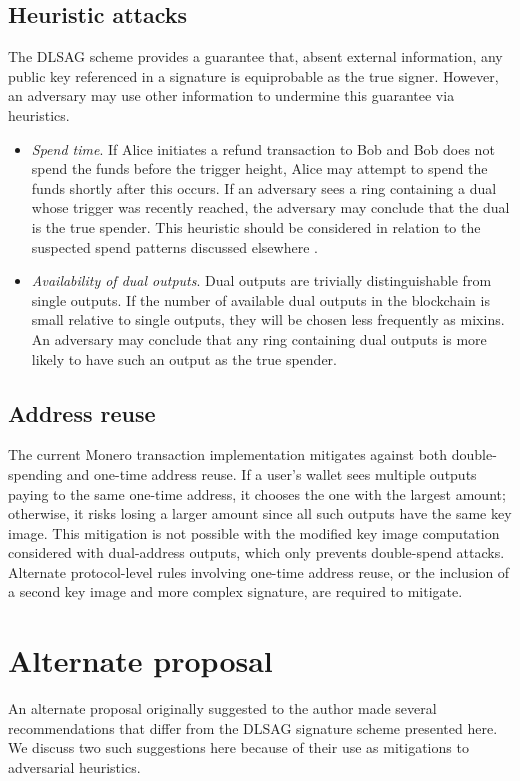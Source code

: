 \documentclass{mrl}
\begin{document}
\subsection{Heuristic attacks}
The DLSAG scheme provides a guarantee that, absent external information, any public key referenced in a signature is equiprobable as the true signer. However, an adversary may use other information to undermine this guarantee via heuristics.
\begin{itemize}
\item \textit{Spend time}. If Alice initiates a refund transaction to Bob and Bob does not spend the funds before the trigger height, Alice may attempt to spend the funds shortly after this occurs. If an adversary sees a ring containing a dual whose trigger was recently reached, the adversary may conclude that the dual is the true spender. This heuristic should be considered in relation to the suspected spend patterns discussed elsewhere \cite{monerolink}.
\item \textit{Availability of dual outputs}. Dual outputs are trivially distinguishable from single outputs. If the number of available dual outputs in the blockchain is small relative to single outputs, they will be chosen less frequently as mixins. An adversary may conclude that any ring containing dual outputs is more likely to have such an output as the true spender.
\end{itemize}

\subsection{Address reuse}
The current Monero transaction implementation mitigates against both double-spending and one-time address reuse. If a user's wallet sees multiple outputs paying to the same one-time address, it chooses the one with the largest amount; otherwise, it risks losing a larger amount since all such outputs have the same key image. This mitigation is not possible with the modified key image computation considered with dual-address outputs, which only prevents double-spend attacks. Alternate protocol-level rules involving one-time address reuse, or the inclusion of a second key image and more complex signature, are required to mitigate.

\section{Alternate proposal}
An alternate proposal originally suggested to the author made several recommendations that differ from the DLSAG signature scheme presented here. We discuss two such suggestions here because of their use as mitigations to adversarial heuristics.
\end{document}
